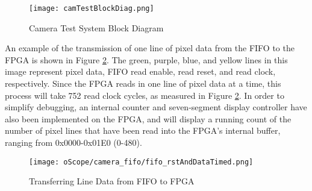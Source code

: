 \begin{figure}[H]
	\centerline{\texttt{[image: camTestBlockDiag.png]}}
	\caption{Camera Test System Block Diagram}
	\label{camTestBDG}
\end{figure}
\par
An example of the transmission of one line of pixel data from the FIFO to the FPGA is shown in Figure \ref{fifoDataOut}.  The green, purple, blue, and yellow lines in this image represent pixel data, FIFO read enable, read reset, and read clock, respectively. Since the FPGA reads in one line of pixel data at a time, this process will take 752 read clock cycles, as measured in Figure \ref{fifoDataOut}. In order to simplify debugging, an internal counter and seven-segment display controller have also been implemented on the FPGA, and will display a running count of the number of pixel lines that have been read into the FPGA's internal buffer, ranging from 0x0000-0x01E0 (0-480). 
\begin{figure}[H]
	\centerline{\texttt{[image: oScope/camera\_fifo/fifo\_rstAndDataTimed.png]}}
	\caption{Transferring Line Data from FIFO to FPGA}
	\label{fifoDataOut}
\end{figure}

